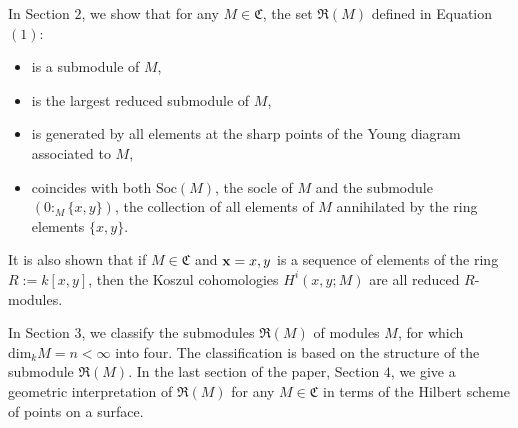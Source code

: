 \documentclass[12pt,a4paper]{article}
\newcommand{\noi}{\noindent}
\begin{document}
		\newpage
		\begin{paragraph}\noi
			In Section $2$, we show that 
			for any $M\in \mathfrak{C}$, the set $\mathfrak{R}(M)$ defined in Equation $(1)$:
			\begin{itemize}
				\item  is a submodule of $M$,
				\item  is the largest reduced submodule of $M$,
				\item  is generated by all elements at the sharp points of the Young diagram associated to $M$,
				\item  coincides with both $\text{Soc}(M)$, the socle of $M$ and the submodule $(0 :_M \{x, y\})$, the collection of all elements of $M$ annihilated by the ring elements $\{x, y\}$. 
			\end{itemize}
			It is also shown that if $M\in \mathfrak{C}$ and ${\bf x}=x, y$ is a sequence of elements of the ring $R:=k[x, y]$, then the Koszul cohomologies $H^i(x, y;M)$ are all reduced $R$-modules.
		\end{paragraph}
		\begin{paragraph}\noi
			In Section $3$, we classify the submodules $\mathfrak{R}(M)$ of modules $M$, for which $\text{dim}_kM=n<\infty$ into four. The classification is based on the structure of the submodule $\mathfrak{R}(M)$.
			In the last section of the paper, Section $4$, we give a geometric interpretation of $\mathfrak{R}(M)$ for any $M \in \mathfrak{C}$ in terms of  the Hilbert scheme of points on a surface.
		\end{paragraph}
		
		
		
		
\end{document}
